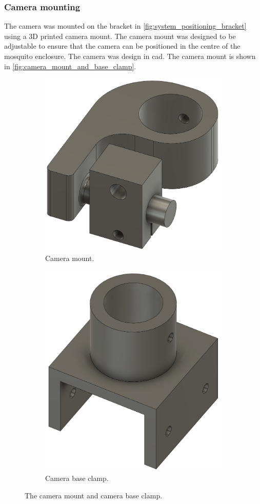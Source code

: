 \subsubsection{Camera mounting}
The camera was mounted on the bracket in \autoref{fig:system_positioning_bracket} using a 3D printed camera mount. The camera mount was designed to be adjustable to ensure that the camera can be positioned in the centre of the mosquito enclosure. The camera was design in \gls{cad}. The camera mount is shown in \autoref{fig:camera_mount_and_base_clamp}.
\begin{figure}[h]
  \centering
  \begin{subfigure}[b]{0.45\textwidth}
    \centering
    \includegraphics[width=0.7\linewidth]{figures/hardware_design/camera_and_middle_clamp.png}
    \caption{Camera mount.}
    \label{fig:camera_mount}
  \end{subfigure}
  \quad
  \begin{subfigure}[b]{0.45\textwidth}
    \centering
    \includegraphics[width=0.7\linewidth]{figures/hardware_design/camera_base_clamp.png}
    \caption{Camera base clamp.}
    \label{fig:camera_base_clamp}
  \end{subfigure}
  \caption{The camera mount and camera base clamp.}
  \label{fig:camera_mount_and_base_clamp}
\end{figure}



